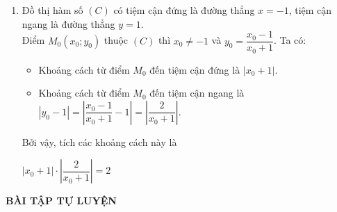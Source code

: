 \begin{vd}
{\begin{enumerate}
\begin{itemize}
\begin{center}
				\end{center}
			\end{itemize}
			\item 
			Đồ thị hàm số $(C)$ có tiệm cận đứng là đường thẳng $x=-1$, tiệm cận ngang là đường thẳng $y=1$.\\
			Điểm $M_0(x_0;y_0)$ thuộc $(C)$ thì $x_0 \ne -1$ và $y_0=\dfrac{x_0-1}{x_0+1}$. Ta có:
			\begin{itemize}
				\item Khoảng cách từ điểm $M_0$ đến tiệm cận đứng là $\left|x_0+1\right|$.
				\item Khoảng cách từ điểm $M_0$ đến tiệm cận ngang là $\left|y_0-1\right|=\left|\dfrac{x_0-1}{x_0+1}-1\right|=\left|\dfrac{2}{x_0+1}\right|$.
			\end{itemize}
			Bởi vậy, tích các khoảng cách này là\\
			\centerline{$\left|x_0+1\right|\cdot \left|\dfrac{2}{x_0+1}\right|=2$}
		\end{enumerate}
	}
\end{vd}
\begin{center}
	\textbf{BÀI TẬP TỰ LUYỆN}
\end{center}


